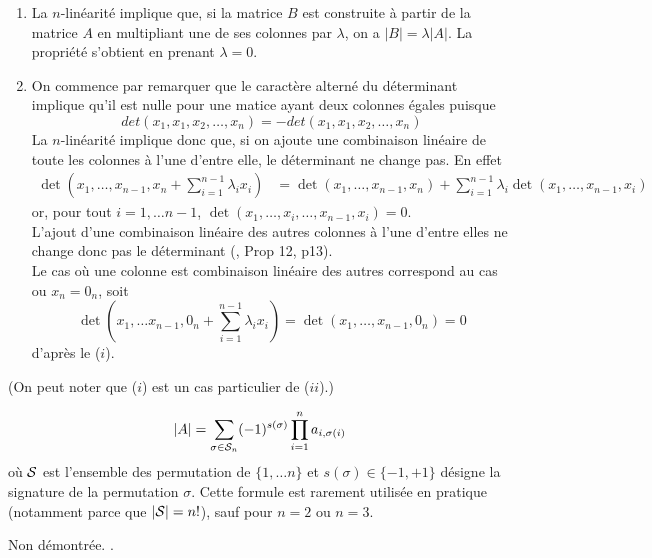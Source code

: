 \proof[Lemme]
  \begin{enumerate}[($i$)] 
  \item La $n$-linéarité implique que, si la matrice $B$ est construite à partir de la matrice $A$ en multipliant une de ses colonnes par $\lambda$, on a $|B| = \lambda |A|$. La propriété s'obtient en prenant $\lambda = 0$.
  \item On commence par remarquer que le caractère alterné du déterminant implique qu'il est nulle pour une matice ayant deux colonnes égales puisque
  $$
  det(x_1, x_1, x_2,\dots, x_n) = -det(x_1, x_1, x_2,\dots, x_n)
  $$
  La $n$-linéarité implique donc que, si on ajoute une combinaison linéaire de toute les colonnes à l'une d'entre elle, le déterminant ne change pas. En effet
  \begin{align*}
    \det\left(x_1, \dots, x_{n-1}, x_n + \sum_{i=1}^{n-1} \lambda_i x_i\right)
    & = \det\left(x_1, \dots, x_{n-1}, x_n\right)
    + \sum_{i=1}^{n-1} \lambda_i \det\left(x_1, \dots, x_{n-1}, x_i\right)
  \end{align*}
  or, pour tout $i = 1, \dots n-1$, $ \det\left(x_1, \dots, x_i, \dots, x_{n-1}, x_i\right) = 0$. \\
  L'ajout d'une combinaison linéaire des autres colonnes à l'une d'entre elles ne change donc pas le déterminant (\cite{GAJ94}, Prop 12, p13). \\
  Le cas où une colonne est combinaison linéaire des autres correspond au cas ou $x_n = 0_n$, soit
  $$
  \det\left(x_1, \dots x_{n-1}, 0_n + \sum_{i=1}^{n-1} \lambda_i x_i\right)
  = \det\left(x_1, \dots, x_{n-1}, 0_n\right)
  = 0
  $$
  d'après le ($i$).
  \end{enumerate}
  (On peut noter que ($i$) est un cas particulier de ($ii$).)
\eproof

\begin{proposition*}
  \begin{equation} \label{eq:determinant}
    |A| = \sum_{\sigma \in \mathcal{S}_n} (-1)^{s(\sigma)} \prod_{i=1}^n a_{i, \sigma(i)} 
    \end{equation}
    où $\mathcal{S}$ est l'ensemble des permutation de $\{1, \dots n\}$ et $s(\sigma) \in \{-1, +1\}$ désigne la signature de la permutation $\sigma$. Cette formule est rarement utilisée en pratique (notamment parce que $|\mathcal{S}| = n!$), sauf pour $n=2$ ou $n=3$.
\end{proposition*}

\proof Non démontrée. \eproof.

\bigskip
{}


